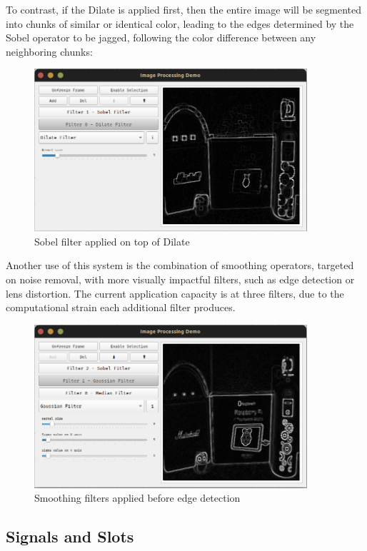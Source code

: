 To contrast, if the Dilate is applied first, then the entire image will be segmented into chunks of similar
or identical color, leading to the edges determined by the Sobel operator to be jagged, following the color
difference between any neighboring chunks:

\begin{figure}[H]
	\includegraphics[width=0.9\textwidth, height=0.45\textwidth]{resources/Layers_2.png}
	\caption{Sobel filter applied on top of Dilate}
\end{figure}

Another use of this system is the combination of smoothing operators, targeted on noise removal, with more
visually impactful filters, such as edge detection or lens distortion. The current application capacity is
at three filters, due to the computational strain each additional filter produces.

\begin{figure}[H]
	\includegraphics[width=0.9\textwidth, height=0.45\textwidth]{resources/Layers_3.png}
	\caption{Smoothing filters applied before edge detection}
\end{figure}

\subsection{Signals and Slots}

